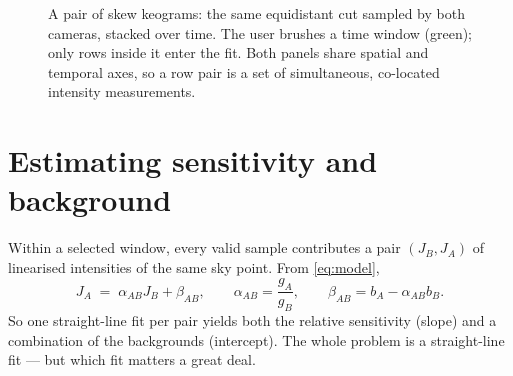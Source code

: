 \documentclass[11pt,a4paper]{article}
\newcommand{\gain}{g}
\newcommand{\off}{b}
\begin{document}
\begin{figure}[t]
\centering
{}
\caption{A pair of skew keograms: the same equidistant cut sampled by both
cameras, stacked over time. The user brushes a time window (green); only rows
inside it enter the fit. Both panels share spatial and temporal axes, so a row
pair is a set of simultaneous, co-located intensity measurements.}
\label{fig:keogram}
\end{figure}

\section{Estimating sensitivity and background}
\label{sec:estimation}

Within a selected window, every valid sample contributes a pair
$(J_B, J_A)$ of linearised intensities of the same sky point. From
\eqref{eq:model},
\begin{equation}
  J_A \;=\; \alpha_{AB} J_B + \beta_{AB},
  \qquad
  \alpha_{AB}=\frac{\gain_A}{\gain_B},
  \qquad
  \beta_{AB}=\off_A-\alpha_{AB}\off_B .
  \label{eq:pairfit}
\end{equation}
So one straight-line fit per pair yields both the relative sensitivity (slope)
and a combination of the backgrounds (intercept). The whole problem is a
straight-line fit --- but which fit matters a great deal.
\end{document}
